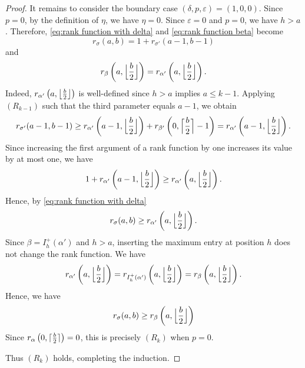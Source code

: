 \documentclass[12pt]{amsart}
\DeclarePairedDelimiter\ceil{\lceil}{\rceil}
\DeclarePairedDelimiter\floor{\lfloor}{\rfloor}
\theoremstyle{definition}
\numberwithin{equation}{section}
\begin{document}
\begin{proof}
It remains to consider the boundary case $(\delta,p,\varepsilon)=(1,0,0)$.
Since $p=0$, by the definition of $\eta$, we have $\eta=0$. Since $\varepsilon=0$ and $p=0$, we have $h>a$. Therefore, \eqref{eq:rank function with delta} and \eqref{eq:rank function beta} become
\begin{equation*}
r_\sigma(a,b)
=
1+r_{\sigma'}(a-1,b-1)
\end{equation*}
and
\begin{equation*}
r_\beta\left(a,\floor[\Big]{\frac{b}{2}}\right)
=
r_{\alpha'}\left(a,\floor[\Big]{\frac{b}{2}}\right).
\end{equation*}
Indeed, $r_{\alpha'}\left(a,\floor*{\tfrac{b}{2}}\right)$ is well-defined since $h > a$ implies $a \leq k-1$.
Applying $(R_{k-1})$
such that the third parameter equals $a-1$,
we obtain
\begin{equation*}
r_{\sigma'}(a-1,b-1)
\geq
r_{\alpha'}\left(
a-1,\floor[\Big]{\frac{b}{2}}
\right) + r_{\beta'}\left(
0,
\ceil[\Big]{\frac{b}{2}}-1
\right) = r_{\alpha'}\left(
a-1,\floor[\Big]{\frac{b}{2}}
\right).
\end{equation*}
Since increasing the first argument of a rank function by one increases
its value by at most one, we have
\begin{equation*}
1+
r_{\alpha'}\left(
a-1,\floor[\Big]{\frac{b}{2}}
\right)
\geq
r_{\alpha'}\left(
a,\floor[\Big]{\frac{b}{2}}
\right).
\end{equation*}
Hence, by \eqref{eq:rank function with delta}
\begin{equation*}
r_\sigma(a,b)
\geq
r_{\alpha'}\left(
a,\floor[\Big]{\frac{b}{2}}
\right).
\end{equation*}
Since $\beta = I_h^+(\alpha')$ and $h>a$, inserting the maximum entry at position $h$ does not change the rank function. We have
\begin{equation*}
   r_{\alpha'}\left(
a,\floor[\Big]{\frac{b}{2}}
\right) = r_{I_h^+(\alpha')}\left(
a,\floor[\Big]{\frac{b}{2}}
\right) = r_{\beta}\left(
a,\floor[\Big]{\frac{b}{2}}
\right).
\end{equation*}
Hence, we have
\begin{equation*}
    r_\sigma(a,b) \geq r_{\beta}\left(
a,\floor[\Big]{\frac{b}{2}}
\right)
\end{equation*}
Since
$r_\alpha\left(
0,\ceil{\tfrac{b}{2}}
\right)=0$, this is precisely $(R_k)$ when $p=0$.

Thus $(R_k)$ holds, completing the induction.
\end{proof}
\end{document}
